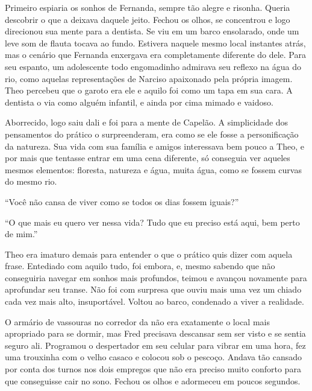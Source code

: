 Primeiro espiaria os sonhos de Fernanda, sempre tão alegre e risonha.
Queria descobrir o que a deixava daquele jeito. Fechou os olhos, se
concentrou e logo direcionou sua mente para a dentista. Se viu em um
barco ensolarado, onde um leve som de flauta tocava ao fundo. Estivera
naquele mesmo local instantes atrás, mas o cenário que Fernanda
enxergava era completamente diferente do dele. Para seu espanto, um
adolescente todo engomadinho admirava seu reflexo na água do rio,
como aquelas representações de Narciso apaixonado pela própria
imagem. Theo percebeu que o garoto era ele e aquilo foi como um tapa em
sua cara. A dentista o via como alguém infantil, e ainda por cima mimado
e vaidoso.

Aborrecido, logo saiu dali e foi para a mente de Capelão. A simplicidade
dos pensamentos do prático o surpreenderam, era como se ele fosse a
personificação da natureza. Sua vida com sua família e amigos
interessava bem pouco a Theo, e por mais que tentasse entrar em uma cena
diferente, só conseguia ver aqueles mesmos elementos: floresta, natureza
e água, muita água, como se fossem curvas do mesmo rio.

``Você não cansa de viver como se todos os dias fossem iguais?''

``O que mais eu quero ver nessa vida? Tudo que eu preciso está aqui, bem
perto de mim.''

Theo era imaturo demais para entender o que o prático quis dizer com
aquela frase. Entediado com aquilo tudo, foi embora, e, mesmo sabendo que
não conseguiria navegar em sonhos mais profundos, teimou e avançou
novamente para aprofundar seu transe. Não foi com surpresa que ouviu
mais uma vez um chiado cada vez mais alto, insuportável. Voltou ao
barco, condenado a viver a realidade.

\asterisc

O armário de vassouras no corredor da  não era exatamente o local
mais apropriado para se dormir, mas Fred precisava descansar sem ser
visto e se sentia seguro ali. Programou o despertador em seu celular
para vibrar em uma hora, fez uma trouxinha com o velho casaco e
colocou sob o pescoço. Andava tão cansado por conta dos turnos
nos dois empregos que não era preciso muito conforto para que
conseguisse cair no sono. Fechou os olhos e adormeceu em poucos
segundos.

